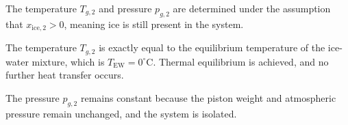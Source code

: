 The temperature \( T_{g,2} \) and pressure \( p_{g,2} \) are determined under the assumption that \( x_{\text{ice},2} > 0 \), meaning ice is still present in the system.  

The temperature \( T_{g,2} \) is exactly equal to the equilibrium temperature of the ice-water mixture, which is \( T_{\text{EW}} = 0^\circ\text{C} \). Thermal equilibrium is achieved, and no further heat transfer occurs.  

The pressure \( p_{g,2} \) remains constant because the piston weight and atmospheric pressure remain unchanged, and the system is isolated.